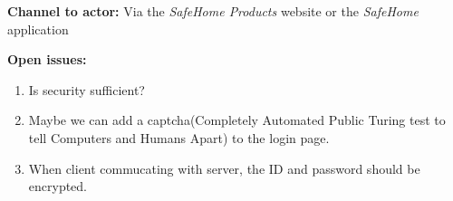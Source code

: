 \documentclass[twoside,11pt]{article}
\begin{document}
\begin{center}
{{\begin{multicols}{2}
                \textbf{Channel to actor:} Via the \emph{SafeHome Products} website or the \emph{SafeHome} application

                \textbf{Open issues:}

                \begin{enumerate}
                    \item Is security sufficient?
                    \item Maybe we can add a captcha(Completely Automated Public Turing test to tell Computers and Humans Apart) to the login page.
                    \item When client commucating with server, the ID and password should be encrypted.
                \end{enumerate}

            \end{multicols}}}
\end{center}

\newpage
\end{document}
